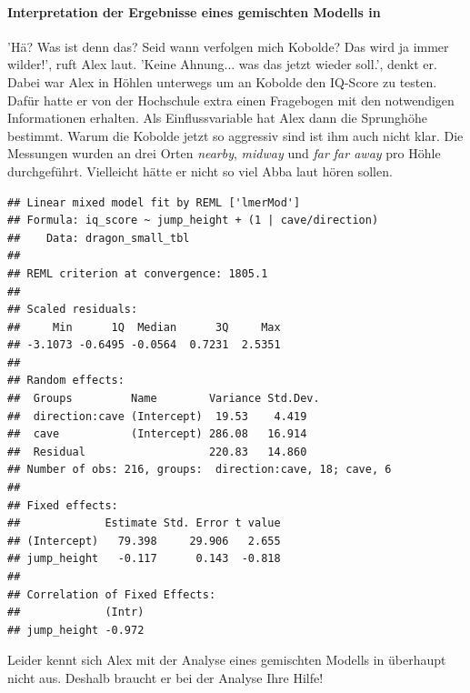 \documentclass[a4paper, 9pt]{scrartcl}\usepackage[]{graphicx}\usepackage[]{xcolor}
\makeatletter
\newenvironment{kframe}{%
 \def\at@end@of@kframe{}%
 \ifinner\ifhmode%
  \def\at@end@of@kframe{\end{minipage}}%
  \begin{minipage}{\columnwidth}%
 \fi\fi%
 \def\FrameCommand##1{\hskip\@totalleftmargin \hskip-\fboxsep
 \colorbox{shadecolor}{##1}\hskip-\fboxsep
     \hskip-\linewidth \hskip-\@totalleftmargin \hskip\columnwidth}%
 \MakeFramed {\advance\hsize-\width
   \@totalleftmargin\z@ \linewidth\hsize
   \@setminipage}}%
 {\par\unskip\endMakeFramed%
 \at@end@of@kframe}
\newenvironment{knitrout}{}{} %
\makeatother
\begin{document}
\ifcollection
\paragraph{Interpretation der Ergebnisse eines gemischten Modells in \Rlogo}
\fi

'Hä? Was ist denn das? Seid wann verfolgen mich Kobolde? Das wird ja immer wilder!', ruft Alex laut. 'Keine Ahnung... was das jetzt wieder soll.', denkt er. Dabei war Alex in Höhlen unterwegs um an Kobolde den IQ-Score zu testen. Dafür hatte er von der Hochschule extra einen Fragebogen mit den notwendigen Informationen erhalten. Als Einflussvariable hat Alex dann die Sprunghöhe bestimmt. Warum die Kobolde jetzt so aggressiv sind ist ihm auch nicht klar. Die Messungen wurden an drei Orten \textit{nearby}, \textit{midway} und \textit{far far away} pro Höhle durchgeführt. Vielleicht hätte er nicht so viel Abba laut hören sollen.


\begin{knitrout}
\color{fgcolor}\begin{kframe}
\begin{verbatim}
## Linear mixed model fit by REML ['lmerMod']
## Formula: iq_score ~ jump_height + (1 | cave/direction)
##    Data: dragon_small_tbl
## 
## REML criterion at convergence: 1805.1
## 
## Scaled residuals: 
##     Min      1Q  Median      3Q     Max 
## -3.1073 -0.6495 -0.0564  0.7231  2.5351 
## 
## Random effects:
##  Groups         Name        Variance Std.Dev.
##  direction:cave (Intercept)  19.53    4.419  
##  cave           (Intercept) 286.08   16.914  
##  Residual                   220.83   14.860  
## Number of obs: 216, groups:  direction:cave, 18; cave, 6
## 
## Fixed effects:
##             Estimate Std. Error t value
## (Intercept)   79.398     29.906   2.655
## jump_height   -0.117      0.143  -0.818
## 
## Correlation of Fixed Effects:
##             (Intr)
## jump_height -0.972
\end{verbatim}
\end{kframe}
\end{knitrout}

Leider kennt sich Alex mit der Analyse eines gemischten Modells in \Rlogo überhaupt nicht aus. Deshalb braucht er bei der Analyse Ihre Hilfe!
\end{document}
